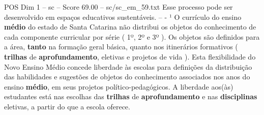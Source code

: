 \begin{textsample}{POS Dim 1 – sc – Score 69.00 – sc/sc\_em\_59.txt}
Esse processo pode ser desenvolvido em espaços educativos sustentáveis. -- - ¹ O currículo do ensino \textbf{médio} do estado de Santa Catarina não distribui os objetos do conhecimento de cada componente curricular por série ( 1º, 2º e 3º ).
Os objetos são definidos para a área, \textbf{tanto} na formação geral básica, quanto nos itinerários formativos ( \textbf{trilhas} de \textbf{aprofundamento}, eletivas e projetos de vida ).
Esta flexibilidade do Novo Ensino Médio concede liberdade às escolas para definições da distribuição das habilidades e sugestões de objetos do conhecimento associados nos anos do ensino \textbf{médio}, em seus projetos político-pedagógicos.
A liberdade aos(às) estudantes está nas escolhas das \textbf{trilhas} de \textbf{aprofundamento} e nas \textbf{disciplinas} eletivas, a partir do que a escola oferece.

\end{textsample}
